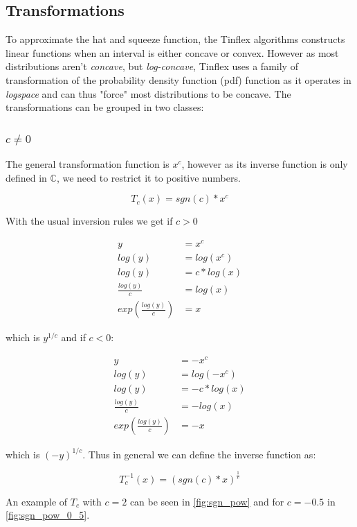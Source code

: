 \subsection{Transformations}

To approximate the hat and squeeze function, the Tinflex algorithms constructs linear functions when an interval is either concave or convex.
However as most distributions aren't \textit{concave}, but \textit{log-concave},
Tinflex uses a family of transformation of the probability density function (pdf) function as it operates in \textit{logspace}
and can thus "force" most distributions to be concave.
The transformations can be grouped in two classes:

\subsubsection{$c \neq 0$}

The general transformation function is $x^c$, however as its inverse function is only defined in $\mathbb{C}$,
we need to restrict it to positive numbers.

\[T_c(x) = sgn(c) * x^c\]

With the usual inversion rules we get if $c > 0$

\begin{align*}
y &= x^c \\
log(y) &= log(x^c) \\
log(y) &= c * log(x) \\
\frac{log(y)}{c} &= log(x) \\
exp\left(\frac{log(y)}{c}\right) &= x
\end{align*}

which is $y^{1 / c}$ and if $c < 0$:

\begin{align*}
y &= -x^c \\
log(y) &= log(-x^c) \\
log(y) &= -c * log(x) \\
\frac{log(y)}{c} &= -log(x) \\
exp\left(\frac{log(y)}{c}\right) &= -x
\end{align*}

which is $(-y)^{1 / c}$.
Thus in general we can define the inverse function as:

\[T_c^{-1}(x) = (sgn(c) * x)^{\frac{1}{c}}\]

An example of $T_c$ with $c = 2$ can be seen in \autoref{fig:sgn_pow} and for $c = -0.5$ in \autoref{fig:sgn_pow_0_5}.

